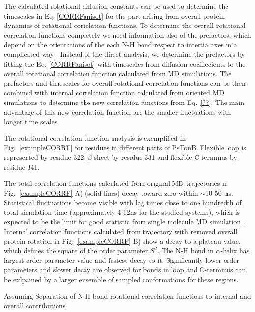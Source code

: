 \documentclass[pre,aps,floatfix,authordate1-4,twocolumn]{revtex4-1}
\begin{document}
The calculated rotational diffusion constants can be used to determine
the timescales in Eq. \ref{CORRFanisot} for the part arising from overall
protein dynamics of rotational correlation functions. To determine the overall
rotational correlation functions completely we need information also of the
prefactors, which depend on the orientations of the each N-H bond respect to
intertia axes in a complicated way \cite{??}. Instead of the direct analysis,
we determine the prefactors by fitting the Eq. \ref{CORRFanisot} with timescales
from diffusion coeffiecients to the overall rotational correlation function
calculated from MD simulations. The prefactors and timescales for overall
rotational correlation functions can be then combined with internal
correlation function calculated from oriented MD simulations to determine
the new correlation functions from Eq.~\ref{??}. The main advantage of this
new correlation function are the smaller fluctuations with longer time
scales.

The rotational correlation function analysis is exemplified in
Fig.~\ref{exampleCORRF} for residues in different parts of PsTonB.
Flexible loop is represented by residue 322, $\beta$-sheet by residue 331
and flexible C-terminus by residue 341. 

The total correlation functions calculated from original MD trajectories
in Fig.~\ref{exampleCORRF} A) (solid lines) decay toward zero within $\sim$10-50~ns.
Statistical fluctuations become visible with lag times close to one
hundredth of total simulation time (approximately 4-12ns for the studied systems),
which is expected to be the limit for good statistic from single molecule MD simulation \cite{lu06}.
Internal correlation functions calculated from trajectory with removed overall
protein rotation in Fig.~\ref{exampleCORRF} B) show a decay to a
plateau value, which defines the square of the order parameter $S^2$.
The N-H bond in $\alpha$-helix has largest order parameter value
and fastest decay to it. Significantly lower order parameters and
slower decay are observed for bonds in loop and C-terminus 
can be exlpained by a larger ensemble of sampled conformations for these regions.

Assuming 
Separation of N-H bond rotational correlation functions
to internal and overall contributions
\end{document}

